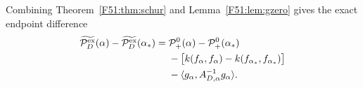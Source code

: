 Combining Theorem~\ref{F51:thm:schur} and Lemma~\ref{F51:lem:gzero} gives the exact
endpoint difference
\begin{align}\label{F51:eq:endpoint-difference}
 \widetilde{\mathcal P_D^{\rm ex}}(\alpha)-\widetilde{\mathcal P_D^{\rm ex}}(\alpha_*)
 ={}&\mathcal P_+^0(\alpha)-\mathcal P_+^0(\alpha_*)\\
 &-\bigl[k(f_\alpha,f_\alpha)
          -k(f_{\alpha_*},f_{\alpha_*})\bigr]\notag\\
 &-\langle g_\alpha,A_{D,\alpha}^{-1}g_\alpha\rangle.\notag
\end{align}
\endgroup
